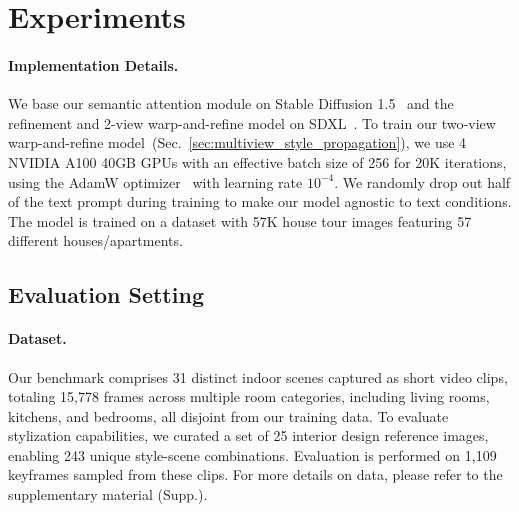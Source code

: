
\section{Experiments}


\paragraph{\bf{Implementation Details.}}
We base our semantic attention module on Stable Diffusion 1.5~\cite{rombach2022latentdiffusion} and the refinement and 2-view warp-and-refine model on SDXL~\cite{podell2024sdxl}. To train our two-view warp-and-refine model~(Sec.~\ref{sec:multiview_style_propagation}), we use 4 NVIDIA A100 40GB GPUs with an effective batch size of 256 for 20K iterations, using the AdamW optimizer~\cite{loshchilov2018adamw} with learning rate $10^{-4}$. We randomly drop out half of the text prompt during training to make our model agnostic to text conditions. The model is trained on a dataset with 57K house tour images featuring 57 different houses/apartments.

\subsection{Evaluation Setting}
\paragraph{\bf{Dataset.}} Our \dataset benchmark comprises 31 distinct indoor scenes captured as short video clips, totaling 15,778 frames across multiple room categories, including living rooms, kitchens, and bedrooms, all disjoint from our training data. To evaluate stylization capabilities, we curated a set of 25 interior design reference images, enabling 243 unique style-scene combinations. Evaluation is performed on 1,109 keyframes sampled from these clips. For more details on data, please refer to the supplementary material (Supp.).


